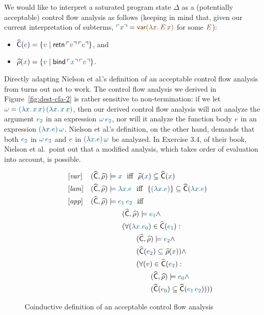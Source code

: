 We would like to interpret a saturated program state $\Delta$ as a
(potentially acceptable) control flow analysis as follows (keeping in
mind that, given our current interpretation of subterms, $\interp{x} =
\lf{{\sf var}(\lambda x.\,E\,x)}$ for some $\lf{E}$):
%
\smallskip
%
\begin{itemize}
\item $\widehat{\sf C}(\obj{e}) = \{ \obj{v} \mid {\sf retn}\,\interp{v}\,\interp{e} \}$, and
\item $\widehat{\rho}(\obj{x}) = \{ \obj{v} \mid {\sf bind}\,\interp{x}\,\interp{v} \}$.
\end{itemize}
%
\smallskip
%
Directly adapting Nielson et al.'s definition of an acceptable control
flow analysis from \cite[Table 3.1]{nielson05principles} turns out not
to work. The control flow analysis we derived in
Figure~\ref{fig:dest-cfa-2} is rather sensitive to non-termination: if
we let $\obj{\omega} = \obj{(\lambda x.\,x\,x)\,(\lambda x.\,x\,x)}$,
then our derived control flow analysis will not analyze the argument
$\obj{e_2}$ in an expression $\obj{\omega\,e_2}$, nor will it analyze
the function body $\obj{e}$ in an expression $\obj{(\lambda
  x.e)\,\omega}$. Nielson et al.'s definition, on the other hand,
demands that both $\obj{e_2}$ in $\obj{\omega\,e_2}$ and $\obj{e}$ in
$\obj{(\lambda x.e)\,\omega}$ be analyzed. In Exercise 3.4, of their
book, Nielson et al.~point out that a modified analysis, which takes
order of evaluation into account, is possible.

\begin{figure}
\begin{align*}
& [{\it var}] & (\widehat{\sf C}, \widehat{\rho}) & \models
  \obj{x} 
  \mbox{~~iff~~} \widehat{\rho}(\obj{x})
    \subseteq \widehat{\sf C}(\obj{x})
\\
& [{\it lam}] & (\widehat{\sf C}, \widehat{\rho}) & \models
  \obj{\lambda x.e}
  \mbox{~~iff~~} \{ \obj{(\lambda x.e)} \} 
    \subseteq \widehat{\sf C}(\obj{\lambda x.e})
\\
\qquad\qquad\qquad& [{\it app}] & (\widehat{\sf C}, \widehat{\rho}) & \models
  \obj{e_1\,e_2} \mbox{~~iff}
\\
& & & \qquad (\widehat{\sf C}, \widehat{\rho}) \models \obj{e_1} \wedge ~
\\
& & & \qquad (\forall(\obj{\lambda x.e_0}) \in \widehat{\sf C}(\obj{e_1}) : ~
\\
& & & \qquad\qquad (\widehat{\sf C}, \widehat{\rho}) \models \obj{e_2} \wedge ~
\\
& & & \qquad\qquad (\widehat{\sf C}(\obj{e_2}) \subseteq \widehat{\rho}(\obj{x})) \wedge ~
\\
& & & \qquad\qquad (\forall(\obj{v}) \in \widehat{\sf C}(\obj{e_2}) : 
\\
& & & \qquad\qquad\qquad (\widehat{\sf C}, \widehat{\rho}) \models \obj{e_0} \wedge ~
\\
& & & \qquad\qquad\qquad(\widehat{\sf C}(\obj{e_0}) \subseteq \widehat{\sf C}(\obj{e_1\,e_2}))))\qquad\qquad\qquad
\end{align*}
\caption{Coinductive definition of an acceptable control flow analysis}
\label{fig:acceptablecontrolflowanalysis}
\end{figure}


